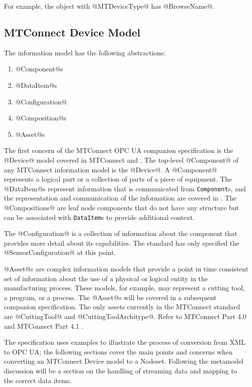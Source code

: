 For example, the object with @MTDeviceType@ has @BrowseName@.

\FloatBarrier

\subsection{MTConnect Device Model}

The \mtconnect information model has the following abstractions:

\begin{enumerate}
\item @Component@s
\item @DataItem@s
\item @Configuration@
\item @Composition@s
\item @Asset@s
\end{enumerate}

The first concern of the MTConnect OPC UA companion specification is the @Device@ model covered in MTConnect \cite{MTCPart2} and \cite{MTCPart3}. The top-level @Component@ of any MTConnect information model is the @Device@. A @Component@ represents a logical part or a collection of parts of a piece of equipment. The @DataItem@s represent information that is communicated from \texttt{Component}s, and the representation and communication of the information are covered in \cite{MTCPart3}. The @Compositions@ are leaf node components that do not have any structure but can be associated with \texttt{DataItem}s to provide additional context. 

The @Configuration@ is a collection of information about the component that provides more detail about its capabilities. The standard has only specified the @SensorConfiguration@ at this point.

@Asset@s are complex information models that provide a point in time consistent set of information about the use of a physical or logical entity in the manufacturing process. These models, for example, may represent a cutting tool, a program, or a process. The @Asset@s will be covered in a subsequent companion specification. The only assets currently in the MTConnect standard are @CuttingTool@ and @CuttingToolArchitype@. Refer to MTConnect Part 4.0 \cite{MTCPart40} and MTConnect Part 4.1 \cite{MTCPart41}.

The specification uses examples to illustrate the process of conversion from XML to OPC UA; the following sections cover the main points and concerns when converting an MTConnect Device model to a Nodeset. Following the metamodel discussion will be a section on the handling of streaming data and mapping to the correct data items. 

